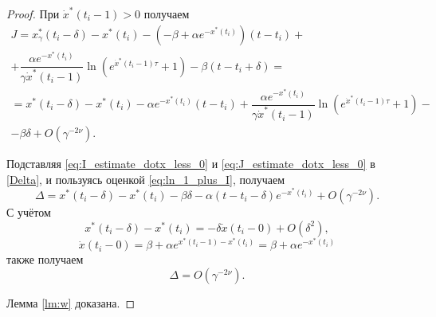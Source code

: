 \begin{proof}
	При $\dot{x}^*(t_i - 1) > 0$ получаем
	\begin{multline}
	\label{eq:J_estimate_dotx_greater_0}
	J = x_{\gamma}^*(t_i - \delta) - x^*(t_i) - (-\beta + \alpha e^{-x^*(t_i)})(t - t_i) +\\+ \dfrac{\alpha e^{-x^*(t_i)}}{\gamma \dot{x}^*(t_i - 1)} \ln\left(e^{\dot{x}^*(t_i - 1)\tau} + 1\right) - \beta(t - t_i + \delta) =\\
	= x^*(t_i - \delta) - x^*(t_i) - \alpha e^{-x^*(t_i)}(t - t_i) + \dfrac{\alpha e^{-x^*(t_i)}}{\gamma \dot{x}^*(t_i - 1)} \ln\left(e^{\dot{x}^*(t_i - 1)\tau} + 1\right) -\\- \beta\delta + O(\gamma^{-2\nu}).
	\end{multline}
	
	Подставляя \eqref{eq:I_estimate_dotx_less_0} и \eqref{eq:J_estimate_dotx_less_0} в \eqref{Delta}, и пользуясь оценкой \eqref{eq:ln_1_plus_I}, получаем
	\[
	\Delta = x^*(t_i - \delta) - x^*(t_i) - \beta \delta - \alpha (t - t_i - \delta) e^{-x^*(t_i)} + O(\gamma^{-2\nu}).
	\]
	С учётом 
	\[
	x^*(t_i - \delta) - x^*(t_i) = -\delta\dot{x}(t_i - 0) + O(\delta^2),
	\]
	\[
	\dot{x}(t_i - 0) = \beta + \alpha e^{x^*(t_i - 1) - x^*(t_i)} = \beta + \alpha e^{-x^*(t_i)}
	\]
	также получаем
	\[
	\Delta = O(\gamma^{-2\nu}).
	\]
	
	Лемма \eqref{lm:w} доказана.
\end{proof}

